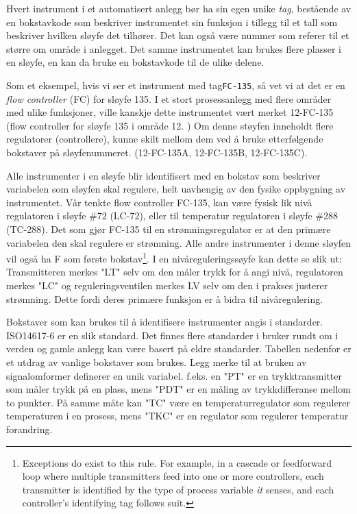 \documentclass[10pt,a5paper]{article}
\begin{document}
\vskip 5pt 
Hvert instrument i et automatisert anlegg bør ha sin egen unike \textit{tag}, bestående av en bokstavkode som beskriver instrumentet sin funksjon i tillegg til et tall som beskriver hvilken sløyfe det tilhører. Det kan også være nummer som referer til et større om område i anlegget. Det samme instrumentet kan brukes flere plasser i en sløyfe, en kan da bruke en bokstavkode til de ulike delene.  

\vskip 5pt 
Som et eksempel, hvis vi ser et instrument med tag\texttt{FC-135}, så vet vi at det er en \textit{flow controller} (FC) for sløyfe 135. I et stort prosessanlegg med flere områder med ulike funksjoner, ville kanskje dette instrumentet vært merket 12-FC-135 (flow controller for sløyfe 135 i område 12. ) Om denne støyfen inneholdt flere regulatorer (controllere), kunne skilt mellom dem ved å bruke etterfølgende bokstaver på sløyfenummeret. (12-FC-135A, 12-FC-135B, 12-FC-135C). 

\vskip 5pt 
Alle instrumenter i en sløyfe blir identifisert med en bokstav som beskriver variabelen som sløyfen skal regulere, helt uavhengig av den fysike oppbygning av instrumentet. Vår tenkte flow controller FC-135, kan være fysisk lik nivå regulatoren i sløyfe \#72 (LC-72), eller til temperatur regulatoren i sløyfe \#288 (TC-288). Det som gjør FC-135 til en strømningsregulator er at den primære variabelen den skal regulere er strømning. Alle andre instrumenter i denne sløyfen vil også ha F som første bokstav\footnote{Exceptions do exist to this rule.  For example, in a cascade or feedforward loop where multiple transmitters feed into one or more controllers, each transmitter is identified by the type of process variable \textit{it} senses, and each controller's identifying tag follows suit.}. I en nivåreguleringssøyfe kan dette se slik ut: Transmitteren merkes "LT" selv om den måler trykk for å angi nivå, regulatoren merkes "LC" og reguleringsventilen merkes LV selv om den i prakses justerer strømning. Dette fordi deres primære funksjon er å bidra til nivåregulering. 


\vskip 5pt 
Bokstaver som kan brukes til å identifisere instrumenter angis i standarder. ISO14617-6 er en slik standard. Det finnes flere standarder i bruker rundt om i verden og gamle anlegg kan være basert på eldre standarder. Tabellen nedenfor er et utdrag av vanlige bokstaver som brukes. Legg merke til at bruken av signalomformer definerer en unik variabel. f.eks. en "PT" er en trykktransmitter som måler trykk på en plass, mens "PDT" er en måling av trykkdifferanse mellom to punkter. På samme måte kan "TC" være en temperaturregulator som regulerer temperaturen i en prosess, mens "TKC" er en regulator som regulerer temperatur forandring. 
\end{document}
